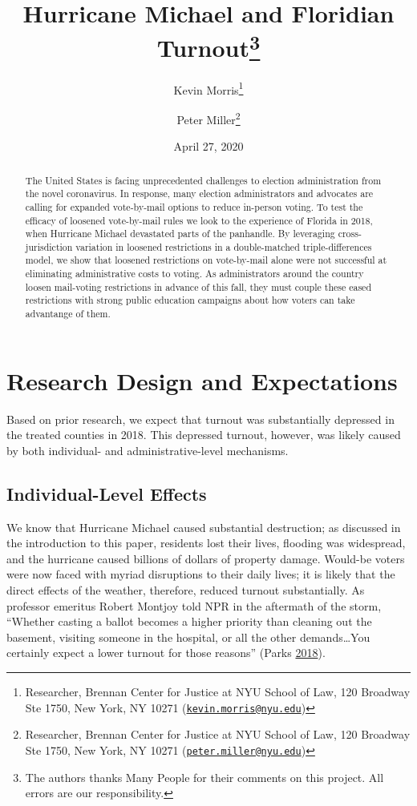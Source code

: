 \documentclass[
  12pt,
]{article}
\title{Hurricane Michael and Floridian Turnout\thanks{The authors thanks Many People for their comments on this project. All errors are our responsibility.}}
\author{Kevin Morris\footnote{Researcher, Brennan Center for Justice at NYU School of Law, 120 Broadway Ste 1750, New York, NY 10271 (\href{mailto:kevin.morris@nyu.edu}{\nolinkurl{kevin.morris@nyu.edu}})} \and Peter Miller\footnote{Researcher, Brennan Center for Justice at NYU School of Law, 120 Broadway Ste 1750, New York, NY 10271 (\href{mailto:peter.miller@nyu.edu}{\nolinkurl{peter.miller@nyu.edu}})}}
\date{April 27, 2020}
\begin{document}
\maketitle
\begin{abstract}
The United States is facing unprecedented challenges to election administration from the novel coronavirus. In response, many election administrators and advocates are calling for expanded vote-by-mail options to reduce in-person voting. To test the efficacy of loosened vote-by-mail rules we look to the experience of Florida in 2018, when Hurricane Michael devastated parts of the panhandle. By leveraging cross-jurisdiction variation in loosened restrictions in a double-matched triple-differences model, we show that loosened restrictions on vote-by-mail alone were not successful at eliminating administrative costs to voting. As administrators around the country loosen mail-voting restrictions in advance of this fall, they must couple these eased restrictions with strong public education campaigns about how voters can take advantange of them.
\end{abstract}

\pagebreak

\doublespacing

\hypertarget{research-design-and-expectations}{%
\section*{Research Design and Expectations}\label{research-design-and-expectations}}

Based on prior research, we expect that turnout was substantially depressed in the treated counties in 2018. This depressed turnout, however, was likely caused by both individual- and administrative-level mechanisms.

\hypertarget{individual-level-effects}{%
\subsection*{Individual-Level Effects}\label{individual-level-effects}}

We know that Hurricane Michael caused substantial destruction; as discussed in the introduction to this paper, residents lost their lives, flooding was widespread, and the hurricane caused billions of dollars of property damage. Would-be voters were now faced with myriad disruptions to their daily lives; it is likely that the direct effects of the weather, therefore, reduced turnout substantially. As professor emeritus Robert Montjoy told NPR in the aftermath of the storm, ``Whether casting a ballot becomes a higher priority than cleaning out the basement, visiting someone in the hospital, or all the other demands\ldots You certainly expect a lower turnout for those reasons'' (Parks \protect\hyperlink{ref-Parks2018}{2018}).
\end{document}
